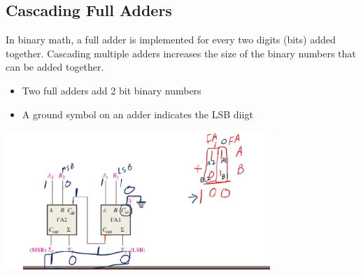 \documentclass[a4paper,12pt]{article}
\begin{document}
            \subsection{Cascading Full Adders}
                In binary math, a full adder is implemented for every two digits (bits) added together. Cascading multiple adders increases the size of the binary numbers that can be added together.
                \begin{itemize}
                    \item Two full adders add 2 bit binary numbers
                    \item A ground symbol on an adder indicates the LSB diigt
                \end{itemize}
                \includegraphics[width=10cm]{CasFull.png}
\end{document}

